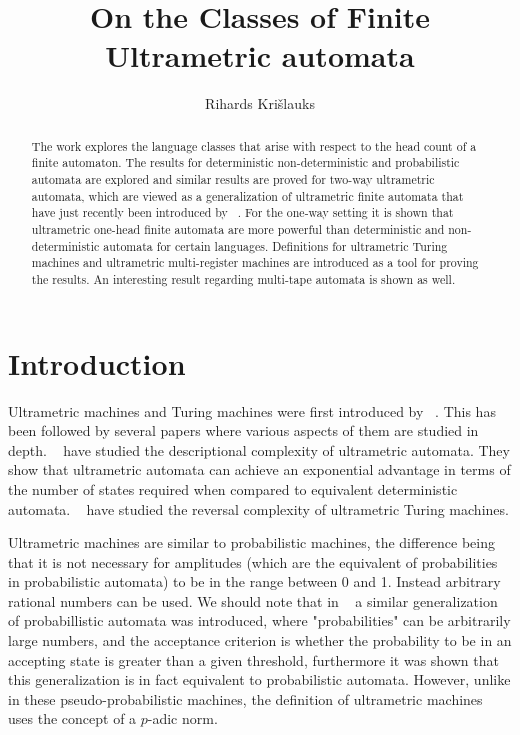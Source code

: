 \documentclass{llncs}
\begin{document}
\title{On the Classes of Finite Ultrametric automata}


\author{
Rihards Kri\v slauks}

\maketitle

\begin{abstract}
The work explores the language classes that arise with respect to the head count of a finite automaton. The results for deterministic non-deterministic and probabilistic automata are explored and similar results are proved for two-way ultrametric automata, which are viewed as a generalization of ultrametric finite automata that have just recently been introduced by ~\citet{Freivalds2012}. For the one-way setting it is shown that ultrametric one-head finite automata are more powerful than deterministic and non-deterministic automata for certain languages. Definitions for ultrametric Turing machines and ultrametric multi-register machines are introduced as a tool for proving the results. An interesting result regarding multi-tape automata is shown as well.
\end{abstract}



\section{Introduction} 
Ultrametric machines and Turing machines were first introduced by ~\citep{Freivalds2012}. This has been followed by several papers where various aspects of them are studied in depth. ~\citep{ KasparsBalodis2013} have studied the descriptional complexity of ultrametric automata. They show that ultrametric automata can achieve an exponential advantage in terms of the number of states required when compared to equivalent deterministic automata. ~\citep{Krislauks2013} have studied the reversal complexity of ultrametric Turing machines.

Ultrametric machines are similar to probabilistic machines, the difference being that it is not necessary for amplitudes (which are the equivalent of probabilities in probabilistic automata) to be in the range between 0 and 1. Instead arbitrary rational numbers can be used. We should note that in ~\citep{Turakainen1969} a similar generalization of probabillistic automata was introduced, where "probabilities" can be arbitrarily large numbers, and the acceptance criterion is whether the probability to be in an accepting state is greater than a given threshold, furthermore it was shown that this generalization is in fact equivalent to probabilistic automata. However, unlike in these pseudo-probabilistic machines, the definition of ultrametric machines uses the concept of a $p$-adic norm.
\end{document}
